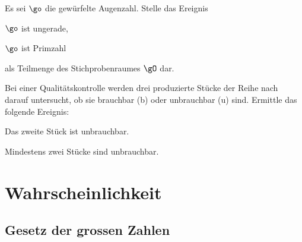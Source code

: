\documentclass[%
11pt,%
twoside,%
titlepage,%
german,%
headsepline%
]{scrartcl}
\begin{document}
\begin{ueb}
Es sei $\go$ die gewürfelte Augenzahl. Stelle das Ereignis
\begin{enumeratea}
\item $\go$ ist ungerade,
\item $\go$ ist Primzahl
\end{enumeratea}
als Teilmenge des Stichprobenraumes $\gO$ dar.
\end{ueb}

\begin{ueb}[Qualitätskontrolle]
Bei einer Qualitätskontrolle werden drei produzierte Stücke der Reihe nach darauf untersucht, ob sie brauchbar (b) oder unbrauchbar (u) sind. Ermittle das folgende Ereignis:
\begin{enumeratea}
\item Das zweite Stück ist unbrauchbar.
\item Mindestens zwei Stücke sind unbrauchbar.
\end{enumeratea}
\end{ueb}

\section{Wahrscheinlichkeit}

\subsection{Gesetz der grossen Zahlen}
\end{document}
